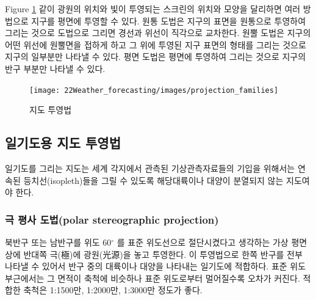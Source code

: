 

Figure \ref{fig:map_projection} \과 같이 광원의 위치와 빛이 투영되는 스크린의 위치와 모양을 달리하면 여러 방법으로 지구를 평면에 투영할 수 있다. 원통 도법은 지구의 표면을 원통으로 투영하여 그리는 것으로 도법으로 그리면 경선과 위선이 직각으로 교차한다. 원뿔 도법은 지구의 어떤 위선에 원뿔면을 접하게 하고 그 위에 투영된 지구 표면의 형태를 그리는 것으로 지구의 일부분만 나타낼 수 있다. 평면 도법은 평면에 투영하여 그리는 것으로 지구의 반구 부분만 나타낼 수 있다.

\begin{figure}[h]
	\centering
	\texttt{[image: 22Weather\_forecasting/images/projection\_families]}
	\caption{지도 투영법}
	\label{fig:map_projection}
\end{figure}

\subsection{일기도용 지도 투영법}
일기도를 그리는 지도는 세계 각지에서 관측된 기상관측자료들의 기입을 위해서는 연속된 등치선(isopleth)들을 그릴 수 있도록 해당대륙이나 대양이 분열되지 않는 지도여야 한다.

\subsubsection{극 평사 도법(polar stereographic projection)}
북반구 또는 남반구를 위도 60$^{\circ}$ 를 표준 위도선으로 절단시켰다고 생각하는 가상 평면 상에 반대쪽 극(極)에 광원(光源)을 놓고 투영한다. 이 투영법으로 한쪽 반구를 전부 나타낼 수 있어서 반구 중의 대륙이나 대양을 나타내는 일기도에 적합하다. 표준 위도 부근에서는 그 면적이 축척에 비슷하나 표준 위도로부터 멀어질수록 오차가 커진다. 적합한 축척은 1:1500만, 1:2000만, 1:3000만 정도가 좋다.

